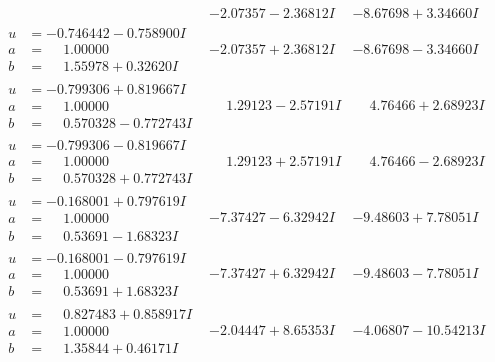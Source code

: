 \documentclass[1p]{elsarticle_modified}
\theoremstyle{definition}
\begin{document}
$$\begin{array}{c|c|c}
 & -2.07357 - 2.36812 I & -8.67698 + 3.34660 I \\ \hline\begin{aligned}
u &= -0.746442 - 0.758900 I \\
a &= \phantom{-}1.00000\phantom{ +0.000000I} \\
b &= \phantom{-}1.55978 + 0.32620 I\end{aligned}
 & -2.07357 + 2.36812 I & -8.67698 - 3.34660 I \\ \hline\begin{aligned}
u &= -0.799306 + 0.819667 I \\
a &= \phantom{-}1.00000\phantom{ +0.000000I} \\
b &= \phantom{-}0.570328 - 0.772743 I\end{aligned}
 & \phantom{-}1.29123 - 2.57191 I & \phantom{-}4.76466 + 2.68923 I \\ \hline\begin{aligned}
u &= -0.799306 - 0.819667 I \\
a &= \phantom{-}1.00000\phantom{ +0.000000I} \\
b &= \phantom{-}0.570328 + 0.772743 I\end{aligned}
 & \phantom{-}1.29123 + 2.57191 I & \phantom{-}4.76466 - 2.68923 I \\ \hline\begin{aligned}
u &= -0.168001 + 0.797619 I \\
a &= \phantom{-}1.00000\phantom{ +0.000000I} \\
b &= \phantom{-}0.53691 - 1.68323 I\end{aligned}
 & -7.37427 - 6.32942 I & -9.48603 + 7.78051 I \\ \hline\begin{aligned}
u &= -0.168001 - 0.797619 I \\
a &= \phantom{-}1.00000\phantom{ +0.000000I} \\
b &= \phantom{-}0.53691 + 1.68323 I\end{aligned}
 & -7.37427 + 6.32942 I & -9.48603 - 7.78051 I \\ \hline\begin{aligned}
u &= \phantom{-}0.827483 + 0.858917 I \\
a &= \phantom{-}1.00000\phantom{ +0.000000I} \\
b &= \phantom{-}1.35844 + 0.46171 I\end{aligned}
 & -2.04447 + 8.65353 I & -4.06807 - 10.54213 I \\ \hline\begin{aligned}

\end{aligned}
\end{array}$$
\end{document}
